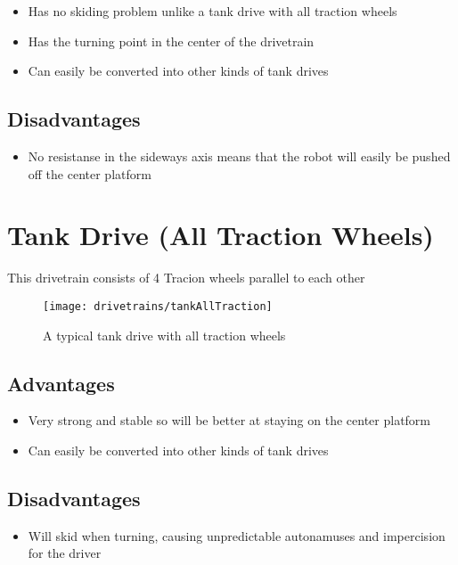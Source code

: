 \documentclass[../../main.tex]{subfiles}
\begin{document}
\begin{itemize}
	\item Has no skiding problem unlike a tank drive with all traction wheels
    \item Has the turning point in the center of the drivetrain
    \item Can easily be converted into other kinds of tank drives
\end{itemize}


\subsection{Disadvantages}

\begin{itemize}
	\item No resistanse in the sideways axis means that the robot will easily be
          pushed off the center platform
\end{itemize}


\section{Tank Drive (All Traction Wheels)}

This drivetrain consists of 4 Tracion wheels parallel to each other

\begin{figure}[h]
	\centering
    \texttt{[image: drivetrains/tankAllTraction]}
	\caption{A typical tank drive with all traction wheels}
	\label{fig:drivetrainTankAllTraction}
\end{figure}

\subsection{Advantages}

\begin{itemize}
	\item Very strong and stable so will be better at staying on the center platform
    \item Can easily be converted into other kinds of tank drives
\end{itemize}


\subsection{Disadvantages}

\begin{itemize}
    \item Will skid when turning, causing unpredictable autonamuses and impercision for the driver
\end{itemize}
\end{document}
